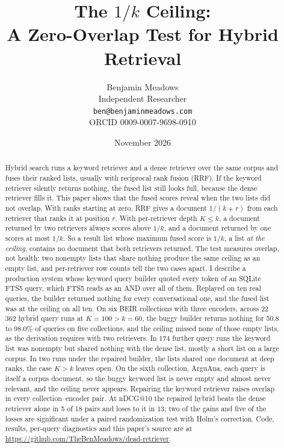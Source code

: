 \documentclass[11pt]{article}
\title{The $1/k$ Ceiling:\\A Zero-Overlap Test for Hybrid Retrieval}
\author{Benjamin Meadows\\Independent Researcher\\\texttt{ben@benjaminmeadows.com}\\ORCID 0009-0007-9698-0910}
\date{November 2026}
\begin{document}
\maketitle

\begin{abstract}
Hybrid search runs a keyword retriever and a dense retriever over the same corpus and fuses their ranked lists, usually with reciprocal rank fusion (RRF). If the keyword retriever silently returns nothing, the fused list still looks full, because the dense retriever fills it. This paper shows that the fused scores reveal when the two lists did not overlap. With ranks starting at zero, RRF gives a document $1/(k+r)$ from each retriever that ranks it at position $r$. With per-retriever depth $K \le k$, a document returned by two retrievers always scores above $1/k$, and a document returned by one scores at most $1/k$. So a result list whose maximum fused score is $1/k$, a list \emph{at the ceiling}, contains no document that both retrievers returned. The test measures overlap, not health: two nonempty lists that share nothing produce the same ceiling as an empty list, and per-retriever row counts tell the two cases apart. I describe a production system whose keyword query builder quoted every token of an SQLite FTS5 query, which FTS5 reads as an AND over all of them. Replayed on ten real queries, the builder returned nothing for every conversational one, and the fused list was at the ceiling on all ten. On six BEIR collections with three encoders, across 22\,362 hybrid query runs at $K = 100 > k = 60$, the buggy builder returns nothing for 50.8 to 98.0\% of queries on five collections, and the ceiling missed none of those empty lists, as the derivation requires with two retrievers. In 174 further query runs the keyword list was nonempty but shared nothing with the dense list, mostly a short list on a large corpus. In two runs under the repaired builder, the lists shared one document at deep ranks, the case $K > k$ leaves open. On the sixth collection, ArguAna, each query is itself a corpus document, so the buggy keyword list is never empty and almost never relevant, and the ceiling never appears. Repairing the keyword retriever raises overlap in every collection--encoder pair. At nDCG@10 the repaired hybrid beats the dense retriever alone in 5 of 18 pairs and loses to it in 13; two of the gains and five of the losses are significant under a paired randomization test with Holm's correction. Code, results, per-query diagnostics and this paper's source are at \url{https://github.com/TheBenMeadows/dead-retriever}.
\end{abstract}
\end{document}
